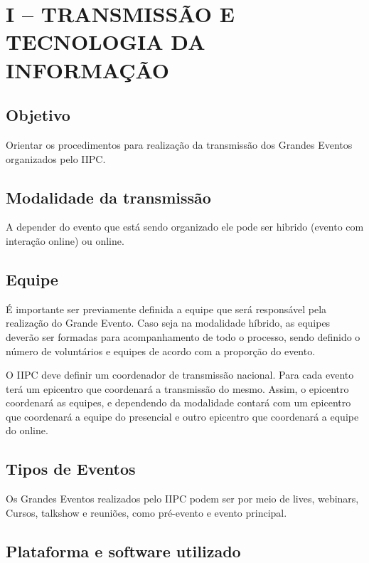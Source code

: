 \documentclass[
]{book}
\begin{document}
\chapter{I -- TRANSMISSÃO E TECNOLOGIA DA
INFORMAÇÃO}\label{i-transmissuxe3o-e-tecnologia-da-informauxe7uxe3o}

\section{Objetivo}\label{objetivo-1}

Orientar os procedimentos para realização da transmissão dos Grandes
Eventos organizados pelo IIPC.

\section{Modalidade da transmissão}\label{modalidade-da-transmissuxe3o}

A depender do evento que está sendo organizado ele pode ser hibrido
(evento com interação online) ou online.

\section{Equipe}\label{equipe}

É importante ser previamente definida a equipe que será responsável pela
realização do Grande Evento. Caso seja na modalidade híbrido, as equipes
deverão ser formadas para acompanhamento de todo o processo, sendo
definido o número de voluntários e equipes de acordo com a proporção do
evento.

O IIPC deve definir um coordenador de transmissão nacional. Para cada
evento terá um epicentro que coordenará a transmissão do mesmo. Assim, o
epicentro coordenará as equipes, e dependendo da modalidade contará com
um epicentro que coordenará a equipe do presencial e outro epicentro que
coordenará a equipe do online.

\section{Tipos de Eventos}\label{tipos-de-eventos}

Os Grandes Eventos realizados pelo IIPC podem ser por meio de lives,
webinars, Cursos, talkshow e reuniões, como pré-evento e evento
principal.

\section{Plataforma e software
utilizado}\label{plataforma-e-software-utilizado}
\end{document}
